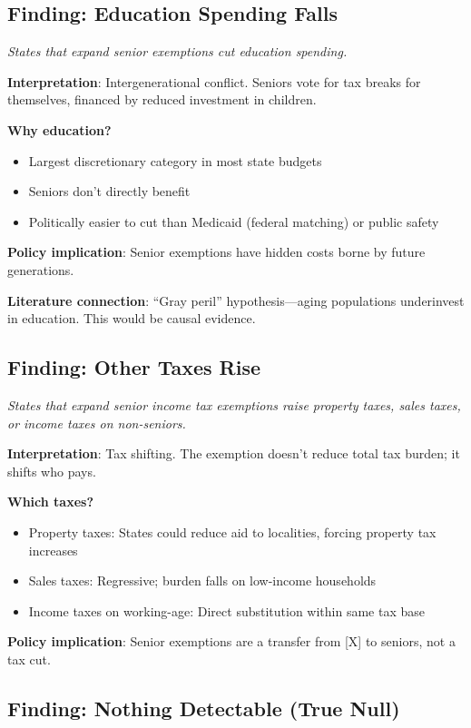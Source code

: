 \documentclass[11pt]{article}
\begin{document}
\subsection{Finding: Education Spending Falls}

\textit{States that expand senior exemptions cut education spending.}

\textbf{Interpretation}: Intergenerational conflict. Seniors vote for tax breaks for themselves, financed by reduced investment in children.

\textbf{Why education?}
\begin{itemize}
    \item Largest discretionary category in most state budgets
    \item Seniors don't directly benefit
    \item Politically easier to cut than Medicaid (federal matching) or public safety
\end{itemize}

\textbf{Policy implication}: Senior exemptions have hidden costs borne by future generations.

\textbf{Literature connection}: ``Gray peril'' hypothesis---aging populations underinvest in education. This would be causal evidence.

\subsection{Finding: Other Taxes Rise}

\textit{States that expand senior income tax exemptions raise property taxes, sales taxes, or income taxes on non-seniors.}

\textbf{Interpretation}: Tax shifting. The exemption doesn't reduce total tax burden; it shifts who pays.

\textbf{Which taxes?}
\begin{itemize}
    \item Property taxes: States could reduce aid to localities, forcing property tax increases
    \item Sales taxes: Regressive; burden falls on low-income households
    \item Income taxes on working-age: Direct substitution within same tax base
\end{itemize}

\textbf{Policy implication}: Senior exemptions are a transfer from [X] to seniors, not a tax cut.

\subsection{Finding: Nothing Detectable (True Null)}
\end{document}
